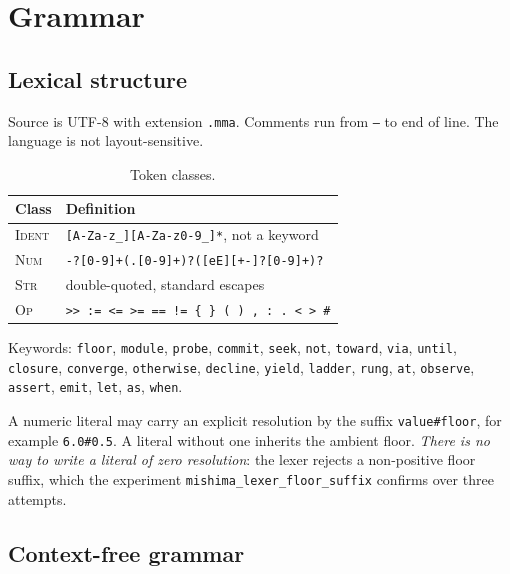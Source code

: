 \documentclass[11pt,twocolumn,a4paper]{article}
\theoremstyle{definition}
\theoremstyle{remark}
\begin{document}
\section{Grammar}
\label{sec:grammar}

\subsection{Lexical structure}

Source is UTF-8 with extension \texttt{.mma}. Comments run from \texttt{--} to
end of line. The language is not layout-sensitive.

\begin{table}[H]
\centering
\small
\caption{Token classes.}
\label{tab:tokens}
\begin{tabular}{@{}ll@{}}
\toprule
Class & Definition \\
\midrule
\textsc{Ident} & \texttt{[A-Za-z\_][A-Za-z0-9\_]*}, not a keyword \\
\textsc{Num}   & \texttt{-?[0-9]+(.[0-9]+)?([eE][+-]?[0-9]+)?} \\
\textsc{Str}   & double-quoted, standard escapes \\
\textsc{Op}    & \texttt{>> := <= >= == != \{ \} ( ) , : . < > \#} \\
\bottomrule
\end{tabular}
\end{table}

Keywords: \texttt{floor}, \texttt{module}, \texttt{probe}, \texttt{commit},
\texttt{seek}, \texttt{not}, \texttt{toward}, \texttt{via}, \texttt{until},
\texttt{closure}, \texttt{converge}, \texttt{otherwise}, \texttt{decline},
\texttt{yield}, \texttt{ladder}, \texttt{rung}, \texttt{at}, \texttt{observe},
\texttt{assert}, \texttt{emit}, \texttt{let}, \texttt{as}, \texttt{when}.

A numeric literal may carry an explicit resolution by the suffix
\texttt{value\#floor}, for example \texttt{6.0\#0.5}. A literal without one
inherits the ambient floor. \emph{There is no way to write a literal of zero
resolution}: the lexer rejects a non-positive floor suffix, which the experiment
\texttt{mishima\_lexer\_floor\_suffix} confirms over three attempts.

\subsection{Context-free grammar}
\end{document}
